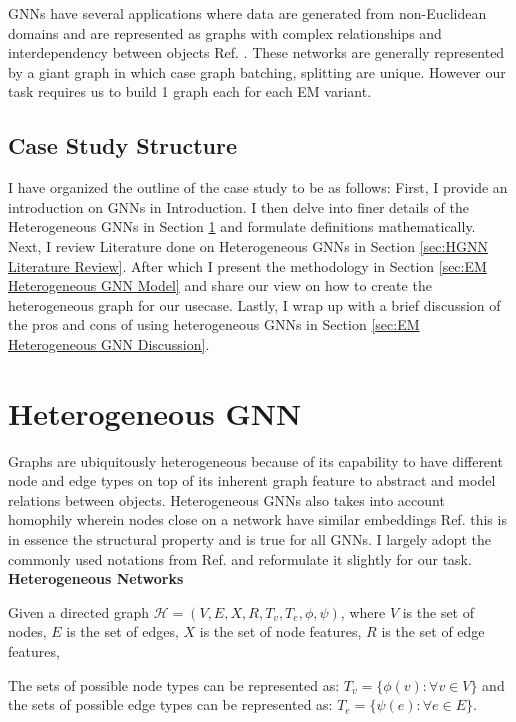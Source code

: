 \documentclass{report} %
\begin{document}
\ac{GNN}s have several applications where data are generated from non-Euclidean domains and are represented as graphs with complex relationships 
and interdependency between objects Ref. \cite{GNN-2019}.
These networks are generally represented by a giant graph in which case graph batching, splitting are unique. However our task requires us to build 1 graph each for each \ac{EM} variant.

\subsection{Case Study Structure}\label{subsec:Case Study Structure}
I have organized the outline of the case study to be as follows:
First, I provide an introduction on \ac{GNN}s in Introduction.
I then delve into finer details of the Heterogeneous \ac{GNN}s in Section \ref{sec:Heterogeneous GNN} and formulate definitions mathematically.
Next, I review Literature done on Heterogeneous \ac{GNN}s in Section \ref{sec:HGNN Literature Review}.
After which I present the methodology in Section \ref{sec:EM Heterogeneous GNN Model} and share our view on how to create the heterogeneous graph for our usecase.
Lastly, I wrap up with a brief discussion of the pros and cons of using heterogeneous \ac{GNN}s in Section \ref{sec:EM Heterogeneous GNN Discussion}.

\section{Heterogeneous GNN}\label{sec:Heterogeneous GNN}

Graphs are ubiquitously heterogeneous because of its capability to have different node and edge types on top of its inherent graph feature to abstract and model 
relations between objects.
Heterogeneous \ac{GNN}s also takes into account homophily wherein nodes close on a network have similar embeddings Ref. \cite{HGNN-2020} this is in essence the structural 
property and is true for all \ac{GNN}s. I largely adopt the commonly used notations from Ref. \cite{ML HGNN-2023} and reformulate it slightly for our task. \\

\textbf{Heterogeneous Networks}

Given a directed graph \( \mathcal{H} = (V, E, X, R, T_v, T_e, \phi, \psi) \), 
where \( V \) is the set of nodes, \( E \) is the set of edges, \( X \) is the set of node features, \( R \) is the set of edge features,

The sets of possible node types can be represented as: \( T_v = \{ \phi(v) : \forall v \in V \} \) and the sets of possible edge types 
can be represented as: \( T_e = \{ \psi(e) : \forall e \in E \}.\) 
\end{document}
